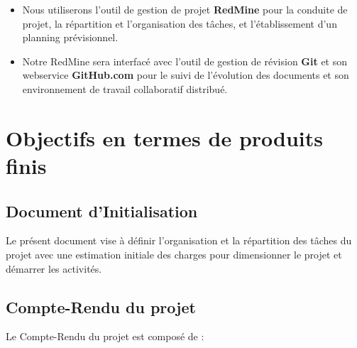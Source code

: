 \begin{itemize}
\item Nous utiliserons l'outil de gestion de projet \textbf{RedMine} pour la conduite de projet, la répartition et l'organisation des tâches, et l'établissement d'un planning prévisionnel.
\item Notre RedMine sera interfacé avec l'outil de gestion de révision \textbf{Git} et son webservice \textbf{GitHub.com} pour le suivi de l'évolution des documents et son environnement de travail collaboratif distribué.
\end{itemize}

\section{Objectifs en termes de produits finis}

\subsection{Document d'Initialisation}

Le présent document vise à définir l'organisation et la répartition des tâches du projet avec une estimation initiale des charges pour dimensionner le projet et démarrer les activités.

\subsection{Compte-Rendu du projet}

Le Compte-Rendu du projet est composé de :

